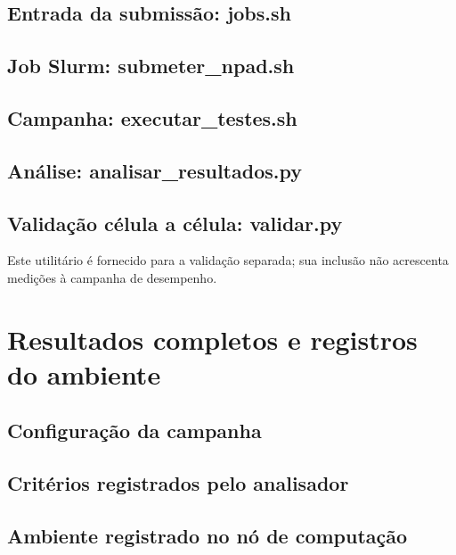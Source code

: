 \documentclass[12pt,a4paper]{article}
\begin{document}
\subsection{Entrada da submissão: jobs.sh}

\subsection{Job Slurm: submeter\_npad.sh}

\clearpage\subsection{Campanha: executar\_testes.sh}

\clearpage\subsection{Análise: analisar\_resultados.py}

\clearpage\subsection{Validação célula a célula: validar.py}
Este utilitário é fornecido para a validação separada; sua inclusão não acrescenta medições à campanha de desempenho.


\clearpage\section{Resultados completos e registros do ambiente}
{\scriptsize\setlength{\tabcolsep}{3pt}}
\subsection{Configuração da campanha}

\subsection{Critérios registrados pelo analisador}

\clearpage\subsection{Ambiente registrado no nó de computação}

\end{document}
